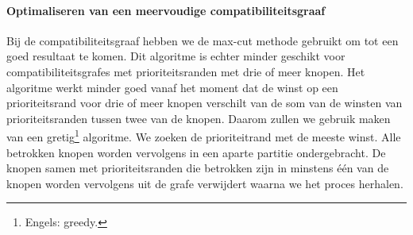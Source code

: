 \paragraph{Optimaliseren van een meervoudige compatibiliteitsgraaf}
Bij de compatibiliteitsgraaf hebben we de max-cut methode gebruikt om tot een goed resultaat te komen. Dit algoritme is echter minder geschikt voor compatibiliteitsgrafes met prioriteitsranden met drie of meer knopen. Het algoritme werkt minder goed vanaf het moment dat de winst op een prioriteitsrand voor drie of meer knopen verschilt van de som van de winsten van prioriteitsranden tussen twee van de knopen. Daarom zullen we gebruik maken van een gretig\footnote{Engels: greedy.} algoritme. We zoeken de prioriteitrand met de meeste winst. Alle betrokken knopen worden vervolgens in een aparte partitie ondergebracht. De knopen samen met prioriteitsranden die betrokken zijn in minstens \'e\'en van de knopen worden vervolgens uit de grafe verwijdert waarna we het proces herhalen.
